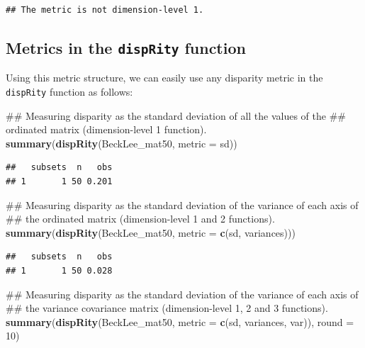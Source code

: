 \documentclass[]{book}
\newenvironment{Shaded}{\begin{snugshade}}{\end{snugshade}}
\newcommand{\KeywordTok}[1]{\textcolor[rgb]{0.13,0.29,0.53}{\textbf{#1}}}
\newcommand{\DataTypeTok}[1]{\textcolor[rgb]{0.13,0.29,0.53}{#1}}
\newcommand{\DecValTok}[1]{\textcolor[rgb]{0.00,0.00,0.81}{#1}}
\newcommand{\NormalTok}[1]{#1}
\theoremstyle{definition}
\theoremstyle{definition}
\theoremstyle{definition}
\theoremstyle{remark}
\begin{document}
\begin{verbatim}
## The metric is not dimension-level 1.
\end{verbatim}

\subsection{\texorpdfstring{Metrics in the \texttt{dispRity}
function}{Metrics in the dispRity function}}\label{metrics-in-the-disprity-function}

Using this metric structure, we can easily use any disparity metric in
the \texttt{dispRity} function as follows:

\begin{Shaded}
\begin{Highlighting}[]
\NormalTok{## Measuring disparity as the standard deviation of all the values of the}
\NormalTok{## ordinated matrix (dimension-level 1 function).}
\KeywordTok{summary}\NormalTok{(}\KeywordTok{dispRity}\NormalTok{(BeckLee_mat50, }\DataTypeTok{metric =}\NormalTok{ sd))}
\end{Highlighting}
\end{Shaded}

\begin{verbatim}
##   subsets  n   obs
## 1       1 50 0.201
\end{verbatim}

\begin{Shaded}
\begin{Highlighting}[]
\NormalTok{## Measuring disparity as the standard deviation of the variance of each axis of}
\NormalTok{## the ordinated matrix (dimension-level 1 and 2 functions).}
\KeywordTok{summary}\NormalTok{(}\KeywordTok{dispRity}\NormalTok{(BeckLee_mat50, }\DataTypeTok{metric =} \KeywordTok{c}\NormalTok{(sd, variances)))}
\end{Highlighting}
\end{Shaded}

\begin{verbatim}
##   subsets  n   obs
## 1       1 50 0.028
\end{verbatim}

\begin{Shaded}
\begin{Highlighting}[]
\NormalTok{## Measuring disparity as the standard deviation of the variance of each axis of}
\NormalTok{## the variance covariance matrix (dimension-level 1, 2 and 3 functions).}
\KeywordTok{summary}\NormalTok{(}\KeywordTok{dispRity}\NormalTok{(BeckLee_mat50, }\DataTypeTok{metric =} \KeywordTok{c}\NormalTok{(sd, variances, var)), }\DataTypeTok{round =} \DecValTok{10}\NormalTok{)}
\end{Highlighting}
\end{Shaded}
\end{document}

